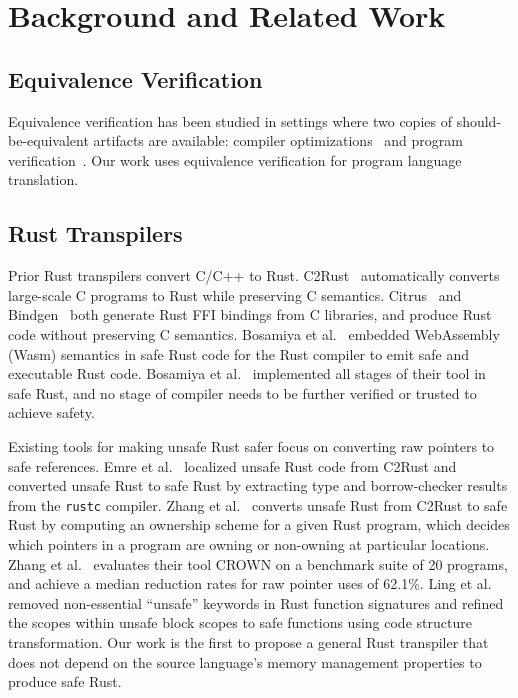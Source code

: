 \documentclass[12pt,openany,oneside,table]{cmuthesis}
\begin{document}
\section{Background and Related Work}

\subsection{Equivalence Verification}

Equivalence verification has been studied in settings where two copies of should-be-equivalent artifacts are available: compiler optimizations~\cite{churchill_semantic_2019,churchill_sound_2017} and program verification~\cite{antonopoulos_algebra_2023,kommrusch_self-supervised_2023}. Our work uses equivalence verification for program language translation.

\subsection{Rust Transpilers}

Prior Rust transpilers convert C/C++ to Rust. C2Rust~\cite{C2Rust} automatically converts large-scale C programs to Rust while preserving C semantics. Citrus~\cite{citrus} and Bindgen~\cite{bindgen} both generate Rust FFI bindings from C libraries, and produce Rust code without preserving C semantics. Bosamiya et al.~\cite{bosamiya2022provably} embedded WebAssembly (Wasm) semantics in safe Rust code for the Rust compiler to emit safe and executable Rust code. Bosamiya et al.~\cite{bosamiya2022provably} implemented all stages of their tool in safe Rust, and no stage of compiler needs to be further verified or trusted to achieve safety.

Existing tools for making unsafe Rust safer focus on converting raw pointers to safe references. Emre et al.~\cite{emre2021translating} localized unsafe Rust code from C2Rust and converted unsafe Rust to safe Rust by extracting type and borrow-checker results from the \texttt{rustc} compiler. Zhang et al.~\cite{zhang2023ownership} converts unsafe Rust from C2Rust to safe Rust by computing an ownership scheme for a given Rust program, which decides which pointers in a program are owning or non-owning at particular locations. Zhang et al.~\cite{zhang2023ownership} evaluates their tool CROWN on a benchmark suite of 20 programs, and achieve a median reduction rates for raw pointer uses of 62.1\%. Ling et al.~\cite{ling2022rust} removed non-essential ``unsafe'' keywords in Rust function signatures and refined the scopes within unsafe block scopes to safe functions using code structure transformation. Our work is the first to propose a general Rust transpiler that does not depend on the source language's memory management properties to produce safe Rust.
\end{document}
